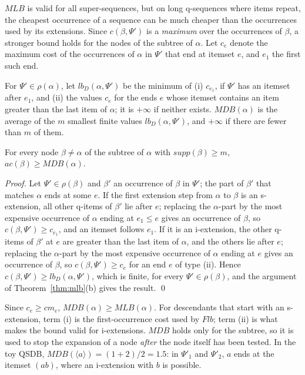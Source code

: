\documentclass[runningheads]{llncs}
\newcommand{\flb}{\ensuremath{\mathit{Flb}}}
\newcommand{\mlb}{\ensuremath{\mathit{MLB}}}
\newcommand{\mdb}{\ensuremath{\mathit{MDB}}}
\newcommand{\supp}{\ensuremath{\mathit{supp}}}
\newcommand{\ac}{\ensuremath{\mathit{ac}}}
\newcommand{\seq}[1]{\langle #1\rangle}
\begin{document}
\mlb{} is valid for all super-sequences, but on long q-sequences where items repeat, the
cheapest occurrence of a sequence can be much cheaper than the occurrences used by its
extensions. Since $c(\beta,\Psi')$ is a \emph{maximum} over the occurrences of $\beta$, a
stronger bound holds for the nodes of the subtree of $\alpha$. Let $c_e$ denote the maximum
cost of the occurrences of $\alpha$ in $\Psi'$ that end at itemset $e$, and $e_1$ the first such
end.

\begin{definition}[MDB]
For $\Psi' \in \rho(\alpha)$, let $\mathit{lb}_D(\alpha,\Psi')$ be the minimum of (i) $c_{e_1}$, if
$\Psi'$ has an itemset after $e_1$, and (ii) the values $c_e$ for the ends $e$ whose itemset
contains an item greater than the last item of $\alpha$; it is $+\infty$ if neither exists.
$\mdb(\alpha)$ is the average of the $m$ smallest finite values $\mathit{lb}_D(\alpha,\Psi')$,
and $+\infty$ if there are fewer than $m$ of them.
\end{definition}

\begin{proposition}\label{prop:mdb}
For every node $\beta \ne \alpha$ of the subtree of $\alpha$ with $\supp(\beta) \ge m$,
$\ac(\beta) \ge \mdb(\alpha)$.
\end{proposition}
\begin{proof}
Let $\Psi' \in \rho(\beta)$ and $\beta'$ an occurrence of $\beta$ in $\Psi'$; the part of $\beta'$
that matches $\alpha$ ends at some $e$. If the first extension step from $\alpha$ to $\beta$ is an
s-extension, all other q-items of $\beta'$ lie after $e$; replacing the $\alpha$-part by the most
expensive occurrence of $\alpha$ ending at $e_1 \le e$ gives an occurrence of $\beta$, so
$c(\beta,\Psi') \ge c_{e_1}$, and an itemset follows $e_1$. If it is an i-extension, the other
q-items of $\beta'$ at $e$ are greater than the last item of $\alpha$, and the others lie after
$e$; replacing the $\alpha$-part by the most expensive occurrence of $\alpha$ ending at $e$ gives
an occurrence of $\beta$, so $c(\beta,\Psi') \ge c_e$ for an end $e$ of type (ii). Hence
$c(\beta,\Psi') \ge \mathit{lb}_D(\alpha,\Psi')$, which is finite, for every $\Psi' \in
\rho(\beta)$, and the argument of Theorem~\ref{thm:mlb}(b) gives the result. \qed
\end{proof}

Since $c_e \ge \mathit{cm}_e$, $\mdb(\alpha) \ge \mlb(\alpha)$. For descendants that start with an
s-extension, term (i) is the first-occurrence cost used by \flb{}; term (ii) is what makes the
bound valid for i-extensions. \mdb{} holds only for the subtree, so it is used to stop the
expansion of a node \emph{after} the node itself has been tested. In the toy QSDB,
$\mdb(\seq{a}) = (1 + 2)/2 = 1.5$: in $\Psi'_1$ and $\Psi'_2$, $a$ ends at the itemset $(ab)$,
where an i-extension with $b$ is possible.
\end{document}
